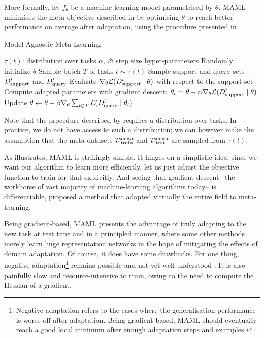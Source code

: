 \documentclass[11pt]{article}
\numberwithin{equation}{subsection}
\begin{document}
More formally, let $f_\theta$ be a machine-learning model parametrised by $\theta$. MAML minimises the meta-objective described in  by optimising $\theta$ to reach better performance on average after adaptation, using the procedure presented in .

\begin{algorithm}[ht]
  \caption{Model-Agnostic Meta-Learning \citep{finn2017model}}
  \label{algo:maml}
  \begin{algorithmic}[1]
    \REQUIRE $\tau(t)$: distribution over tasks
    \REQUIRE $\alpha$, $\beta$: step size hyper-parameters
    \STATE Randomly initialize $\theta$
      \STATE Sample batch $T$ of tasks $t \sim \tau(t)$
        \STATE Sample support and query sets ${D_{\mathrm{support}}^t}$ and ${D_{\mathrm{query}}^t}$
        \STATE Evaluate $\nabla_\theta \mathcal{L}({D_{\mathrm{support}}^t} \mid \theta)$ with respect to the support set
        \STATE Compute adapted parameters with gradient descent:
        $\theta_t=\theta-\alpha \nabla_\theta \mathcal{L}({D_{\mathrm{support}}^t} \mid \theta)$
      \ENDFOR
      \STATE Update $\theta \leftarrow \theta - \beta \nabla_\theta \sum_{t \in T}  \mathcal{L}({D_{\mathrm{query}}^t} \mid \theta_t)$
    \ENDWHILE
  \end{algorithmic}
\end{algorithm}

Note that the procedure described by  requires a distribution over tasks. In practice, we do not have access to such a distribution; we can however make the assumption that the meta-datasets ${\mathcal{D}_\mathrm{train}^\mathrm{meta}}$ and ${\mathcal{D}_\mathrm{test}^\mathrm{meta}}$ are sampled from $\tau(t)$.

As  illustrates, MAML is strikingly simple. It hinges on a simplistic idea: since we want our algorithm to learn more efficiently, let us just adjust the objective function to train for that explicitly. And seeing that gradient descent –the workhorse of vast majority of machine-learning algorithms today– is differentiable, \citeauthor{finn2017model} proposed a method that adapted virtually the entire field to meta-learning.

Being gradient-based, MAML presents the advantage of truly adapting to the new task at test time and in a principled manner, where some other methods merely learn huge representation networks in the hope of mitigating the effects of domain adaptation. Of course, it does have some drawbacks. For one thing, negative adaptation\footnote{Negative adaptation refers to the cases where the generalisation performance is worse off after adaptation. Being gradient-based, MAML should eventually reach a good local minimum after enough adaptation steps and examples.} remains possible and not yet well-understood \citep{deleu2018effects}. It is also painfully slow and resource-intensive to train, owing to the need to compute the Hessian of a gradient.
\end{document}
